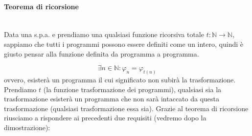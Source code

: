 \documentclass{article}
\begin{document}
\paragraph{Teorema di ricorsione}\mbox{}\\
Data una s.p.a. e prendiamo una qualsiasi funzione ricorsiva totale $t:\mathbb{N}\rightarrow\mathbb{N}$,
sappiamo che tutti i programmi possono essere definiti come un intero, quindi è giusto
pensar alla funzione definita da programma a programma.

$$\exists n\in\mathbb{N}:\varphi_n=\varphi_{t(n)}$$
ovvero, esisterà un programma il cui significato non subirà la trasformazione. Prendiamo $t$ (la
funzione trasformazione dei programmi), qualsiasi sia la trasformazione esisterà un programma
che non sarà intaccato da questa trasformazione (qualsiasi trasformazione essa sia). Grazie
al teorema di ricorsione riusciamo a rispondere ai precedenti due requisiti (vedremo
dopo la dimostrazione):
\end{document}
